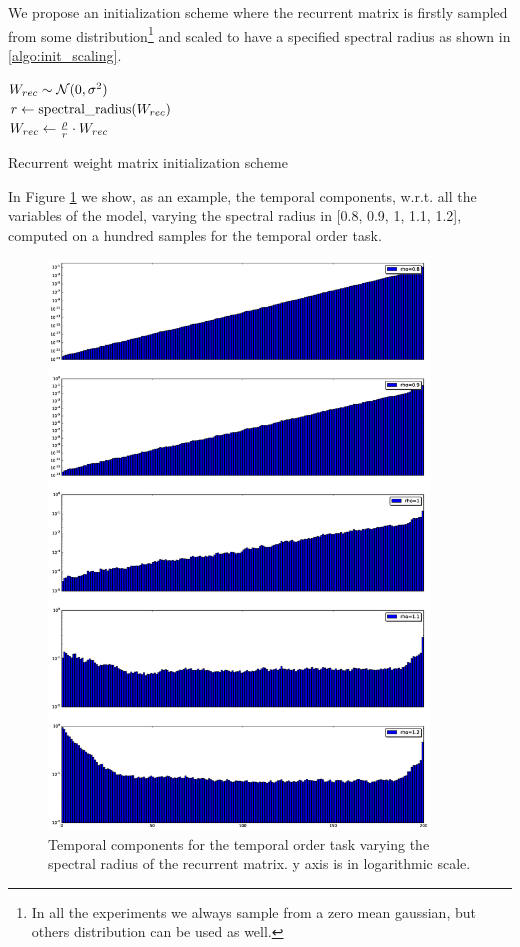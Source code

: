 We propose an initialization scheme where the recurrent matrix is firstly sampled from some distribution\footnote{In all the experiments we always sample from a zero mean gaussian, but others distribution can be used as well.} and scaled to have a specified spectral radius as shown in \ref{algo:init_scaling}.

\begin{algorithm}[!h]
	\BlankLine

	$W_{rec} \sim \mathcal{N}(0, \sigma^2)$\\
	$r \gets \mbox{spectral\_radius}(W_{rec})$\\
	$W_{rec}\gets \frac{\rho}{r} \cdot W_{rec}$\\
	\caption{Recurrent weight matrix initialization scheme}
	\label{algo:init_scaling}
\end{algorithm}

 In Figure \ref{fig:temporal_norms} we show, as an example, the temporal components, w.r.t. all the variables of the model, varying the spectral radius in [0.8, 0.9, 1, 1.1, 1.2], computed on a hundred samples for the temporal order task.

\begin{figure}
    \includegraphics[width=0.9\textwidth]{chapter3/temporal_components.eps}
    \caption{Temporal components for the temporal order task varying the spectral radius of the recurrent matrix. y axis is in logarithmic scale.}
    \label{fig:temporal_norms}
\end{figure}


